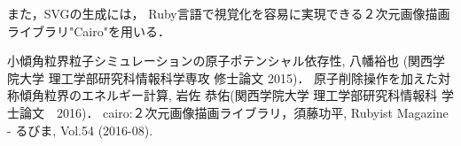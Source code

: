 \documentclass[a4j,twocolumn]{jsarticle}
\begin{document}
また，SVGの生成には，
Ruby言語で視覚化を容易に実現できる２次元画像描画ライブラリ"Cairo"を用いる\cite{sudoh}．


\begin{thebibliography}{9}
 小傾角粒界粒子シミュレーションの原子ポテンシャル依存性, 八幡裕也 (関西学院大学 理工学部研究科情報科学専攻 修士論文 2015)．
 原子削除操作を加えた対称傾角粒界のエネルギー計算, 岩佐 恭佑(関西学院大学 理工学部研究科情報科 学士論文　2016)． 
 cairo:２次元画像描画ライブラリ，須藤功平, Rubyist Magazine - るびま, Vol.54 (2016-08).
\end{thebibliography}
\end{document}
